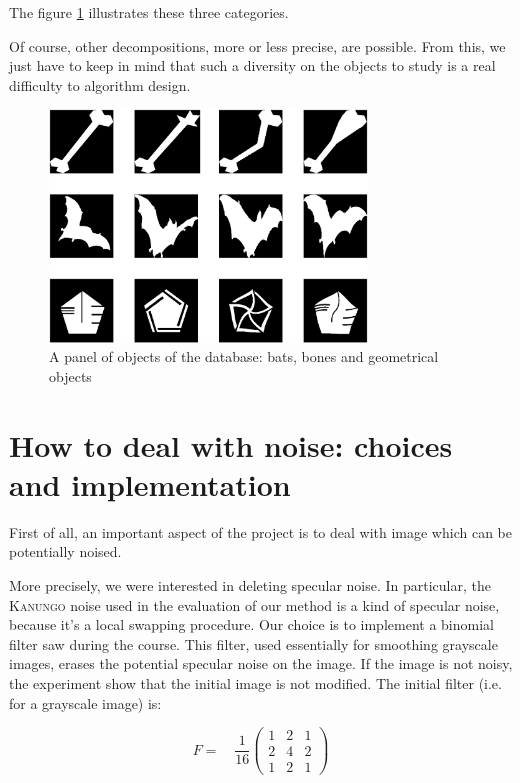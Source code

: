 The figure \ref{shapedata} illustrates these three categories.

\label{categories}

Of course, other decompositions, more or less precise, are possible. From this, we just have to keep in mind that such a diversity on the objects to study is a real difficulty to algorithm design.

\begin{figure}[!ht]
    \centering
    \includegraphics[height=175pt]{images/shapedata.eps}
	\caption{A panel of objects of the database: bats, bones and geometrical objects}
	\label{shapedata}
\end{figure}


\section{How to deal with noise: choices and implementation}

\label{filter}

First of all, an important aspect of the project is to deal with image which can be potentially noised.

More precisely, we were interested in deleting specular noise. In particular, the \textsc{Kanungo} noise used in the evaluation of our method is a kind of specular noise, because it's a local swapping procedure. Our choice is to implement a binomial filter saw during the course. This filter, used essentially for smoothing grayscale images, erases the potential specular noise on the image. If the image is not noisy, the experiment show that the initial image is not modified. The initial filter (i.e. for a grayscale image) is:

\setcounter{MaxMatrixCols}{3}
\[ F = \quad \frac{1}{16} \begin{pmatrix}
1 & 2 & 1 \\
2 & 4 & 2 \\
1 & 2 & 1
\end{pmatrix}\]

